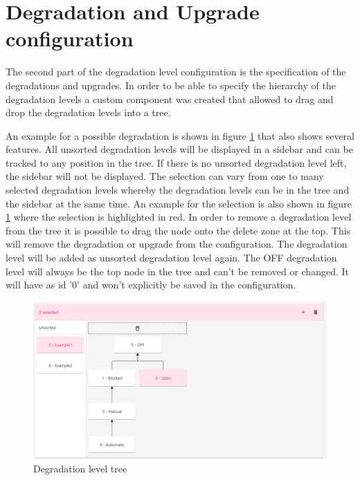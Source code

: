 \section{Degradation and Upgrade configuration}
\label{sec:deg_and_upg}

The second part of the degradation level configuration is the specification of the degradations and upgrades. In order to be able to specify the hierarchy of the degradation levels a custom component was created that allowed to drag and drop the degradation levels into a tree.

An example for a possible degradation is shown in figure \ref{fig:degradation_level_tree} that also shows several features. All unsorted degradation levels will be displayed in a sidebar and can be tracked to any position in the tree. If there is no unsorted degradation level left, the sidebar will not be displayed. The selection can vary from one to many selected degradation levels whereby the degradation levels can be in the tree and the sidebar at the same time. An example for the selection is also shown in figure \ref{fig:degradation_level_tree} where the selection is highlighted in red. In order to remove a degradation level from the tree it is possible to drag the node onto the delete zone at the top. This will remove the degradation or upgrade from the configuration. The degradation level will be added as unsorted degradation level again. The OFF degradation level will always be the top node in the tree and can't be removed or changed. It will have as id '0' and won't explicitly be saved in the configuration.

\begin{figure}[ht]
    \centering
    \includegraphics[width=\textwidth]{img/degradation_tree.png}
    \caption{Degradation level tree}
    \label{fig:degradation_level_tree}
\end{figure}

